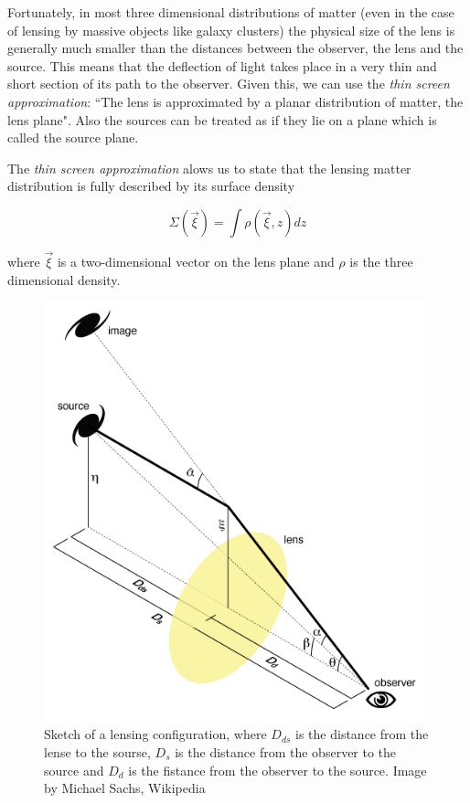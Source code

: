 Fortunately, in most three dimensional distributions of matter (even in the case of lensing by massive objects like galaxy clusters) the physical size of the lens is generally much smaller than the distances between the observer, the lens and the source. This means that the deflection of light takes place in a very thin and short section of its path to the observer. Given this, we can use the \textit{thin screen approximation}: ``The lens is approximated by a planar distribution of matter, the lens plane". Also the sources can be treated as if they lie on a plane which is called the source plane.

The \textit{thin screen approximation} alows us to state that the lensing matter distribution is fully described by its surface density

\begin{equation}
\Sigma(\vec{\xi}) = \int \rho (\vec{\xi},z)dz
\end{equation}

where $\vec{\xi}$ is a two-dimensional vector on the lens plane and $\rho$ is the three dimensional density.

\begin{figure}[H]
\centering
\includegraphics[width=11cm]{images/lensing.png}
\caption[Angles in gravitational lensing]{Sketch of a lensing configuration, where $D_{ds}$ is the distance from the lense to the sourse, $D_s$ is the distance from the observer to the source and $D_d$ is the fistance from the observer to the source. Image by Michael Sachs, Wikipedia}
\end{figure}

